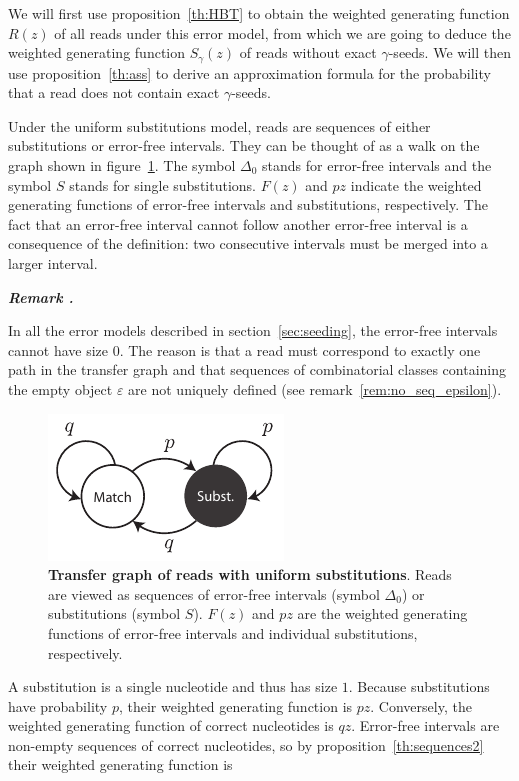 \documentclass{article}
\newcounter{remarkcounter}
\newenvironment{remark}
{\small\it\vspace{0.5\baselineskip}
  \refstepcounter{remarkcounter}%
  \noindent\textbf{Remark \arabic{remarkcounter}.}%
}{\vspace{0.5\baselineskip}}
\begin{document}
We will first use proposition~\ref{th:HBT} to obtain the weighted
generating function $R(z)$ of all reads under this error model, from which
we are going to deduce the weighted generating function $S_\gamma(z)$ of
reads without exact $\gamma$-seeds. We will then use
proposition~\ref{th:ass} to derive an approximation formula for the
probability that a read does not contain exact $\gamma$-seeds.

Under the uniform substitutions model, reads are sequences of either
substitutions or error-free intervals. They can be thought of as a walk on
the graph shown in figure~\ref{fig:subonly}. The symbol $\Delta_0$ stands
for error-free intervals and the symbol $S$ stands for single
substitutions. $F(z)$ and $pz$ indicate the weighted generating functions
of error-free intervals and substitutions, respectively. The fact that an
error-free interval cannot follow another error-free interval is a
consequence of the definition: two consecutive intervals must be merged
into a larger interval.

\begin{remark}
In all the error models described in section~\ref{sec:seeding}, the
error-free intervals cannot have size $0$. The reason is that a read must
correspond to exactly one path in the transfer graph and that sequences of
combinatorial classes containing the empty object $\varepsilon$ are not
uniquely defined (see remark~\ref{rem:no_seq_epsilon}).
\end{remark}

\begin{figure}[h]
\centering
\includegraphics[scale=0.9]{substitutions_only.pdf}
\caption{\textbf{Transfer graph of reads with uniform substitutions}.
Reads are viewed as sequences of error-free intervals (symbol
$\Delta_0$) or substitutions (symbol $S$). $F(z)$ and $pz$ are the
weighted generating functions of error-free intervals and individual
substitutions, respectively.}
\label{fig:subonly}
\end{figure}

A substitution is a single nucleotide and thus has size $1$. Because
substitutions have probability $p$, their weighted generating function is
$pz$. Conversely, the weighted generating function of correct nucleotides
is $qz$. Error-free intervals are non-empty sequences of correct
nucleotides, so by proposition~\ref{th:sequences2} their weighted
generating function is
\end{document}
